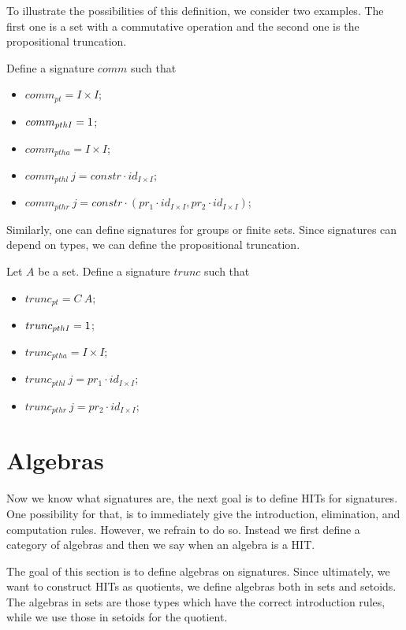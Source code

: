 \documentclass[9pt]{entcs}
\newcommand{\constructor}[1]{#1}
\newcommand{\1}{\type{1}} %
\newcommand{\C}{\constructor{C}} %
\newcommand{\I}{\constructor{I}} %
\newcommand{\prodP}[2]{#1 \times #2} %
\newcommand{\id}[1]{\constructor{id}_{#1}} %
\newcommand{\comp}[2]{#1 \cdot #2} %
\newcommand{\prle}{\constructor{pr}_1} %
\newcommand{\prre}{\constructor{pr}_2} %
\newcommand{\pair}[2]{(#1 , #2)} %
\newcommand{\constr}{\constructor{constr}} %
\newcommand{\pt}[0]{pt}
\newcommand{\pthI}[0]{pthI}
\newcommand{\pthA}[0]{ptha}
\newcommand{\pthlh}[0]{pthl}
\newcommand{\pthrh}[0]{pthr}
\newcommand{\pointc}[1]{#1_{\pt}} %
\newcommand{\pathI}[1]{#1_{\pthI}} %
\newcommand{\pathA}[1]{#1_{\pthA}} %
\newcommand{\pathlh}[1]{#1_{\pthlh}} %
\newcommand{\pathrh}[1]{#1_{\pthrh}} %
\newcommand{\comm}{comm}
\newcommand{\trunc}{trunc}
\begin{document}
To illustrate the possibilities of this definition, we consider two examples.
The first one is a set with a commutative operation and the second one is the propositional truncation.

\begin{example}
Define a signature $\comm$ such that
\begin{itemize}
	\item $\pointc{\comm} = \prodP{\I}{\I}$;
	\item $\pathI{\comm} = \1$;
	\item $\pathA{\comm} = \prodP{\I}{\I}$;
	\item $\pathlh{\comm} \> j = \comp{\constr}{\id{\prodP{\I}{\I}}}$;
	\item $\pathrh{\comm} \> j = \comp{\constr}{\pair{\comp{\prle}{\id{\prodP{\I}{\I}}}}{\comp{\prre}{\id{\prodP{\I}{\I}}}}}$;
\end{itemize}
\end{example}

Similarly, one can define signatures for groups or finite sets.
Since signatures can depend on types, we can define the propositional truncation.

\begin{example}
Let $A$ be a set.
Define a signature $\trunc$ such that
\begin{itemize}
	\item $\pointc{\trunc} = \C \> A$;
	\item $\pathI{\trunc} = \1$;
	\item $\pathA{\trunc} = \prodP{\I}{\I}$;
	\item $\pathlh{\trunc} \> j = \comp{\prle}{\id{\prodP{\I}{\I}}}$;
	\item $\pathrh{\trunc} \> j = \comp{\prre}{\id{\prodP{\I}{\I}}}$;
\end{itemize}
\end{example}

\section{Algebras}
Now we know what signatures are, the next goal is to define HITs for signatures.
One possibility for that, is to immediately give the introduction, elimination, and computation rules.
However, we refrain to do so.
Instead we first define a category of algebras and then we say when an algebra is a HIT.

The goal of this section is to define algebras on signatures.
Since ultimately, we want to construct HITs as quotients, we define algebras both in sets and setoids.
The algebras in sets are those types which have the correct introduction rules, while we use those in setoids for the quotient.
\end{document}

